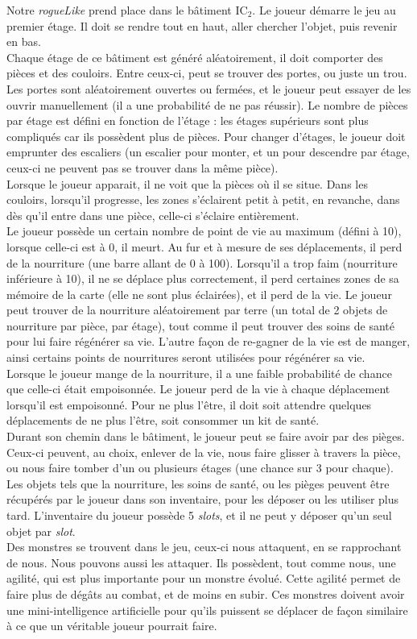 \documentclass[11pt]{report}
\begin{document}
	Notre \emph{rogueLike} prend place dans le bâtiment IC$_2$. Le joueur démarre le jeu au premier étage. Il doit se rendre tout en haut, aller chercher l'objet, puis revenir en bas.\\
	Chaque étage de ce bâtiment est généré aléatoirement, il doit comporter des pièces et des couloirs. Entre ceux-ci, peut se trouver des portes, ou juste un trou. Les portes sont aléatoirement ouvertes ou fermées, et le joueur peut essayer de les ouvrir manuellement (il a une probabilité de ne pas réussir). Le nombre de pièces par étage est défini en fonction de l'étage : les étages supérieurs sont plus compliqués car ils possèdent plus de pièces. Pour changer d'étages, le joueur doit emprunter des escaliers (un escalier pour monter, et un pour descendre par étage, ceux-ci ne peuvent pas se trouver dans la même pièce).\\
	Lorsque le joueur apparait, il ne voit que la pièces où il se situe. Dans les couloirs, lorsqu'il progresse, les zones s'éclairent petit à petit, en revanche, dans dès qu'il entre dans une pièce, celle-ci s'éclaire entièrement.\\
	Le joueur possède un certain nombre de point de vie au maximum (défini à 10), lorsque celle-ci est à 0, il meurt. Au fur et à mesure de ses déplacements, il perd de la nourriture (une barre allant de 0 à 100). Lorsqu'il a trop faim (nourriture inférieure à 10), il ne se déplace plus correctement, il perd certaines zones de sa mémoire de la carte (elle ne sont plus éclairées), et il perd de la vie. Le joueur peut trouver de la nourriture aléatoirement par terre (un total de 2 objets de nourriture par pièce, par étage), tout comme il peut trouver des soins de santé pour lui faire régénérer sa vie. L'autre façon de re-gagner de la vie est de manger, ainsi certains points de nourritures seront utilisées pour régénérer sa vie.\\
	Lorsque le joueur mange de la nourriture, il a une faible probabilité de chance que celle-ci était empoisonnée. Le joueur perd de la vie à chaque déplacement lorsqu'il est empoisonné. Pour ne plus l'être, il doit soit attendre quelques déplacements de ne plus l'être, soit consommer un kit de santé.\\
	Durant son chemin dans le bâtiment, le joueur peut se faire avoir par des pièges. Ceux-ci peuvent, au choix, enlever de la vie, nous faire glisser à travers la pièce, ou nous faire tomber d'un ou plusieurs étages (une chance sur 3 pour chaque).\\
	Les objets tels que la nourriture, les soins de santé, ou les pièges peuvent être récupérés par le joueur dans son inventaire, pour les déposer ou les utiliser plus tard. L'inventaire du joueur possède 5 \emph{slots}, et il ne peut y déposer qu'un seul objet par \emph{slot}.\\
	Des monstres se trouvent dans le jeu, ceux-ci nous attaquent, en se rapprochant de nous. Nous pouvons aussi les attaquer. Ils possèdent, tout comme nous, une agilité, qui est plus importante pour un monstre évolué. Cette agilité permet de faire plus de dégâts au combat, et de moins en subir. Ces monstres doivent avoir une mini-intelligence artificielle pour qu'ils puissent se déplacer de façon similaire à ce que un véritable joueur pourrait faire.
	
\end{document}
